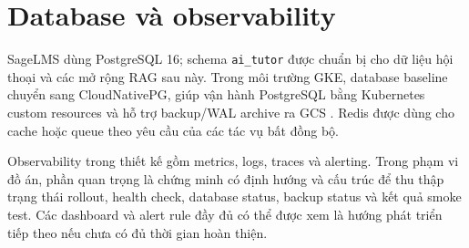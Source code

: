\section{Database và observability}

SageLMS dùng PostgreSQL 16; schema \texttt{ai\_tutor} được chuẩn bị cho dữ liệu hội thoại và các mở rộng RAG sau này. Trong môi trường GKE, database baseline chuyển sang CloudNativePG, giúp vận hành PostgreSQL bằng Kubernetes custom resources và hỗ trợ backup/WAL archive ra GCS \cite{cloudnativepg}. Redis được dùng cho cache hoặc queue theo yêu cầu của các tác vụ bất đồng bộ.

Observability trong thiết kế gồm metrics, logs, traces và alerting. Trong phạm vi đồ án, phần quan trọng là chứng minh có định hướng và cấu trúc để thu thập trạng thái rollout, health check, database status, backup status và kết quả smoke test. Các dashboard và alert rule đầy đủ có thể được xem là hướng phát triển tiếp theo nếu chưa có đủ thời gian hoàn thiện.
